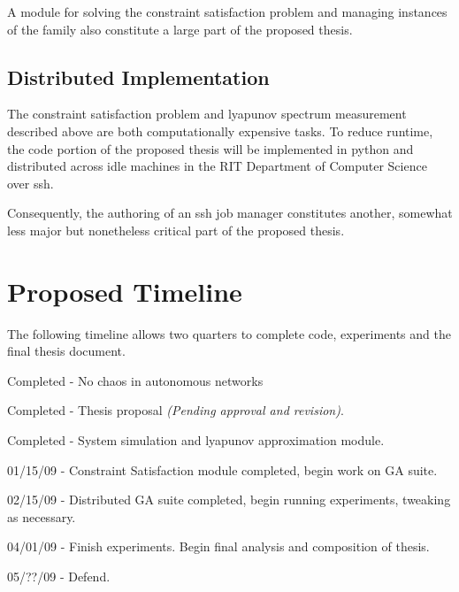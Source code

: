 \documentclass[12pt]{article}
\begin{document}
A module for solving the constraint satisfaction problem and managing instances
of the family also constitute a large part of the proposed thesis.

\subsection{Distributed Implementation}
The constraint satisfaction problem and lyapunov spectrum measurement described
above are both computationally expensive tasks.  To reduce runtime, the code
portion of the proposed thesis will be implemented in python and distributed
across idle machines in the RIT Department of Computer Science over ssh.

Consequently, the authoring of an ssh job manager constitutes another, somewhat
less major but nonetheless critical part of the proposed thesis.

\section{Proposed Timeline}
The following timeline allows two quarters to complete code, experiments and the final thesis document.

Completed - No chaos in autonomous networks

Completed - Thesis proposal \textit{(Pending approval and revision)}.

Completed - System simulation and lyapunov approximation module.

01/15/09 - Constraint Satisfaction module completed, begin work on GA suite.

02/15/09 - Distributed GA suite completed, begin running experiments, tweaking as necessary.

04/01/09 - Finish experiments.  Begin final analysis and composition of thesis.

05/??/09 - Defend.
\end{document}
